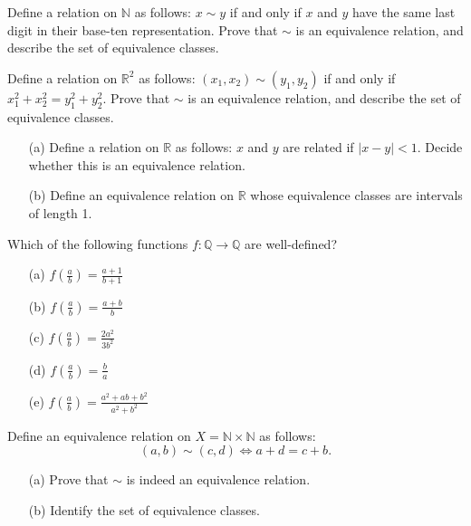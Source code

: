   \begin{exercise}
    Define a relation on $\mathbb{N}$ as follows: $x \sim y$ if and only if $x$ and $y$ have the same last digit in their base-ten representation. Prove that $\sim$ is an equivalence relation, and describe the set of equivalence classes.
  \end{exercise}

  \begin{exercise}
    Define a relation on $\mathbb{R}^2$ as follows: $(x_1, x_2) \sim (y_1, y_2)$ if and only if $x_1^2 + x_2^2 = y_1^2 + y_2^2$. Prove that $\sim$ is an equivalence relation, and describe the set of equivalence classes.
  \end{exercise}

  \begin{exercise}
    \begin{enumerate}
      \item[(a)] Define a relation on $\mathbb{R}$ as follows: $x$ and $y$ are related if $|x - y| < 1$. Decide whether this is an equivalence relation.
      \item[(b)] Define an equivalence relation on $\mathbb{R}$ whose equivalence classes are intervals of length 1.
    \end{enumerate}
  \end{exercise}

  \begin{exercise}
    Which of the following functions $f: \mathbb{Q} \to \mathbb{Q}$ are well-defined?
    \begin{enumerate}
      \item[(a)] $f(\frac{a}{b}) = \frac{a+1}{b+1}$
      \item[(b)] $f(\frac{a}{b}) = \frac{a+b}{b}$
      \item[(c)] $f(\frac{a}{b}) = \frac{2a^2}{3b^2}$
      \item[(d)] $f(\frac{a}{b}) = \frac{b}{a}$
      \item[(e)] $f(\frac{a}{b}) = \frac{a^2+ab+b^2}{a^2+b^2}$
    \end{enumerate}
  \end{exercise}

  \begin{exercise}
    Define an equivalence relation on $X = \mathbb{N} \times \mathbb{N}$ as follows:
    $$(a, b) \sim (c, d) \Leftrightarrow a + d = c + b.$$
    \begin{enumerate}
      \item[(a)] Prove that $\sim$ is indeed an equivalence relation.
      \item[(b)] Identify the set of equivalence classes.
    \end{enumerate}
  \end{exercise}


